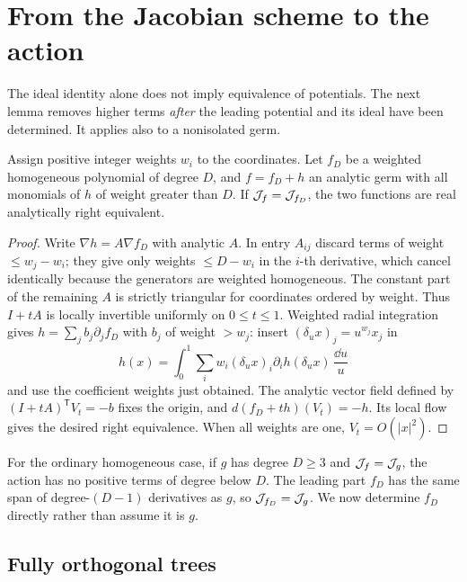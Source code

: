 \section{From the Jacobian scheme to the action}\label{sec:normal}

The ideal identity alone does not imply equivalence of potentials. The next lemma removes higher terms \emph{after} the leading potential and its ideal have been determined. It applies also to a nonisolated germ.

\begin{lemma}\label{lem:moser}
Assign positive integer weights \(w_i\) to the coordinates. Let \(f_D\) be a weighted homogeneous polynomial of degree \(D\), and \(f=f_D+h\) an analytic germ with all monomials of \(h\) of weight greater than \(D\). If \(\mathcal J_f=\mathcal J_{f_D}\), the two functions are real analytically right equivalent.
\end{lemma}
\begin{proof}
Write \(\nabla h=A\nabla f_D\) with analytic \(A\). In entry \(A_{ij}\) discard terms of weight \(\le w_j-w_i\); they give only weights \(\le D-w_i\) in the \(i\)-th derivative, which cancel identically because the generators are weighted homogeneous. The constant part of the remaining \(A\) is strictly triangular for coordinates ordered by weight. Thus \(I+tA\) is locally invertible uniformly on \(0\le t\le 1\). Weighted radial integration gives \(h=\sum_j b_j\partial_j f_D\) with \(b_j\) of weight \(>w_j\): insert \((\delta_u x)_j=u^{w_j}x_j\) in
\[
 h(x)=\int_0^1\sum_i w_i(\delta_u x)_i
                     \partial_i h(\delta_u x)\,\frac{\dd u}{u}
\]
and use the coefficient weights just obtained. The analytic vector field defined by \((I+tA)^{\mathsf T} V_t=-b\) fixes the origin, and \(d(f_D+t h)(V_t)=-h\). Its local flow gives the desired right equivalence. When all weights are one, \(V_t=O(|x|^2)\).
\end{proof}

For the ordinary homogeneous case, if \(g\) has degree \(D\ge3\) and \(\mathcal J_f=\mathcal J_g\), the action has no positive terms of degree below \(D\). The leading part \(f_D\) has the same span of degree-\((D-1)\) derivatives as \(g\), so \(\mathcal J_{f_D}=\mathcal J_g\). We now determine \(f_D\) directly rather than assume it is \(g\).

\subsection{Fully orthogonal trees}

